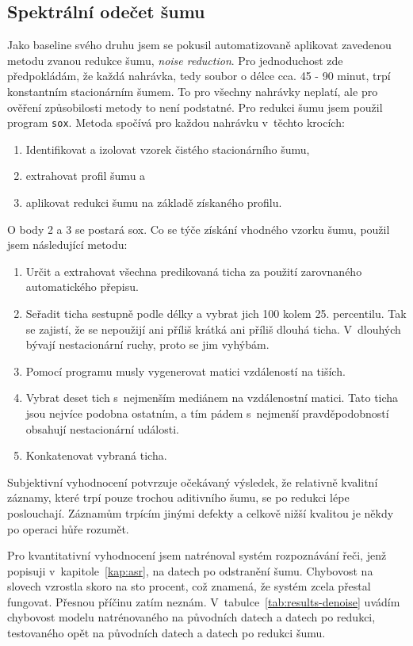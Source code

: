 \subsection{Spektrální odečet šumu}

Jako baseline svého druhu jsem se pokusil automatizovaně aplikovat zavedenou
metodu zvanou redukce šumu, \textit{noise reduction}. Pro jednoduchost zde
předpokládám, že každá nahrávka, tedy soubor o délce cca. 45 - 90 minut, trpí konstantním stacionárním šumem. To pro
všechny nahrávky neplatí, ale pro ověření způsobilosti metody to není podstatné.
Pro redukci šumu jsem použil program \texttt{sox}. Metoda spočívá pro každou
nahrávku v~těchto krocích:
\begin{enumerate}
\item{Identifikovat a izolovat vzorek čistého stacionárního šumu,}
\item{extrahovat profil šumu a}
\item{aplikovat redukci šumu na základě získaného profilu.}
\end{enumerate}

O body 2 a 3 se postará sox. Co se týče získání vhodného vzorku šumu, použil jsem
následující metodu:
\begin{enumerate}
\item{
    Určit a extrahovat všechna predikovaná ticha za použití zarovnaného
    automatického přepisu.
}
\item{
    Seřadit ticha sestupně podle délky a vybrat jich 100 kolem 25. percentilu.
    Tak se zajistí, že se nepoužijí ani příliš krátká ani příliš dlouhá ticha.
    V~dlouhých bývají nestacionární ruchy, proto se jim vyhýbám.
}
\item{
    Pomocí programu musly vygenerovat matici vzdáleností na tiších.
}
\item{
    Vybrat deset tich s~nejmenším mediánem na vzdálenostní matici. Tato ticha
    jsou nejvíce podobna ostatním, a tím pádem s~nejmenší pravděpodobností
    obsahují nestacionární události.
}
\item{
    Konkatenovat vybraná ticha.
}
\end{enumerate}

Subjektivní vyhodnocení potvrzuje očekávaný výsledek, že relativně kvalitní
záznamy, které trpí pouze trochou aditivního šumu, se po redukci lépe
poslouchají. Záznamům trpícím jinými defekty a celkově nižší kvalitou je někdy po
operaci hůře rozumět.

Pro kvantitativní vyhodnocení jsem natrénoval systém rozpoznávání řeči, jenž
popisuji v~kapitole~\ref{kap:asr}, na datech po odstranění šumu. Chybovost na
slovech vzrostla skoro na sto procent, což znamená, že systém zcela přestal
fungovat. Přesnou příčinu zatím neznám.
V~tabulce~\ref{tab:results-denoise} uvádím chybovost modelu natrénovaného na
původních datech a datech po redukci, testovaného opět na původních datech a
datech po redukci šumu.

